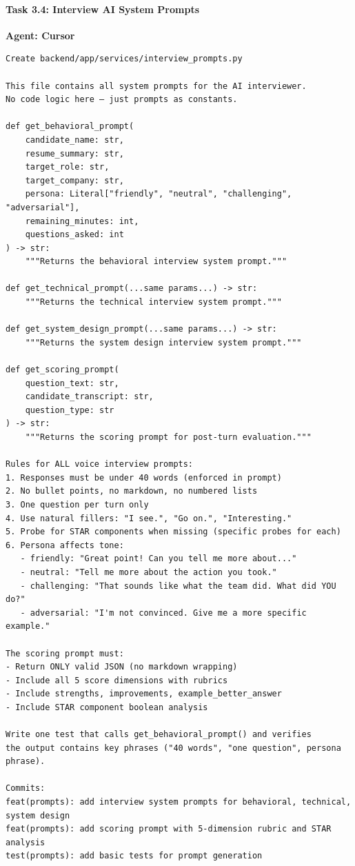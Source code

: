\documentclass[
  11pt,
]{article}
\begin{document}
\hypertarget{task-3.4-interview-ai-system-prompts}{%
\paragraph{Task 3.4: Interview AI System
Prompts}\label{task-3.4-interview-ai-system-prompts}}

\textbf{Agent: Cursor}

\begin{lstlisting}
Create backend/app/services/interview_prompts.py

This file contains all system prompts for the AI interviewer.
No code logic here — just prompts as constants.

def get_behavioral_prompt(
    candidate_name: str,
    resume_summary: str,
    target_role: str,
    target_company: str,
    persona: Literal["friendly", "neutral", "challenging", "adversarial"],
    remaining_minutes: int,
    questions_asked: int
) -> str:
    """Returns the behavioral interview system prompt."""

def get_technical_prompt(...same params...) -> str:
    """Returns the technical interview system prompt."""

def get_system_design_prompt(...same params...) -> str:
    """Returns the system design interview system prompt."""

def get_scoring_prompt(
    question_text: str,
    candidate_transcript: str,
    question_type: str
) -> str:
    """Returns the scoring prompt for post-turn evaluation."""

Rules for ALL voice interview prompts:
1. Responses must be under 40 words (enforced in prompt)
2. No bullet points, no markdown, no numbered lists
3. One question per turn only
4. Use natural fillers: "I see.", "Go on.", "Interesting."
5. Probe for STAR components when missing (specific probes for each)
6. Persona affects tone:
   - friendly: "Great point! Can you tell me more about..."
   - neutral: "Tell me more about the action you took."
   - challenging: "That sounds like what the team did. What did YOU do?"
   - adversarial: "I'm not convinced. Give me a more specific example."

The scoring prompt must:
- Return ONLY valid JSON (no markdown wrapping)
- Include all 5 score dimensions with rubrics
- Include strengths, improvements, example_better_answer
- Include STAR component boolean analysis

Write one test that calls get_behavioral_prompt() and verifies
the output contains key phrases ("40 words", "one question", persona phrase).

Commits:
feat(prompts): add interview system prompts for behavioral, technical, system design
feat(prompts): add scoring prompt with 5-dimension rubric and STAR analysis
test(prompts): add basic tests for prompt generation
\end{lstlisting}
\end{document}
